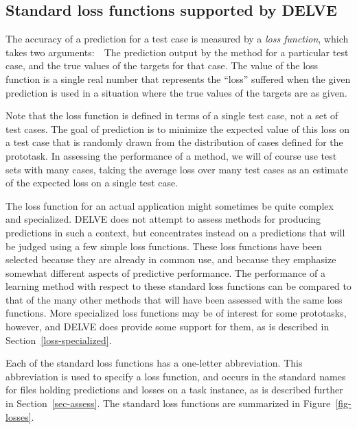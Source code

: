 \subsection{Standard loss functions supported by DELVE}\label{loss-standard}

The accuracy of a prediction for a test case is measured by a {\em
loss function\/}, which takes two arguments:\ \ The prediction output
by the method for a particular test case, and the true values of
the targets for that case.  The value of the loss function is a single
real number that represents the ``loss'' suffered when the given
prediction is used in a situation where the true values of the targets
are as given.  

Note that the loss function is defined in terms of a single test case,
not a set of test cases.  The goal of prediction is to minimize the
expected value of this loss on a test case that is randomly drawn from
the distribution of cases defined for the prototask.  In assessing the
performance of a method, we will of course use test sets with many
cases, taking the average loss over many test cases as an estimate of
the expected loss on a single test case.

The loss function for an actual application might sometimes be quite
complex and specialized.  DELVE does not attempt to assess methods for
producing predictions in such a context, but concentrates instead on a
predictions that will be judged using a few simple loss functions.
These loss functions have been selected because they are already in
common use, and because they emphasize somewhat different aspects of
predictive performance.  The performance of a learning method with
respect to these standard loss functions can be compared to that of
the many other methods that will have been assessed with the same
loss functions.  More specialized loss functions may be of interest
for some prototasks, however, and DELVE does provide some support for
them, as is described in Section~\ref{loss-specialized}.

Each of the standard loss functions has a one-letter abbreviation.
This abbreviation is used to specify a loss function, and occurs in
the standard names for files holding predictions and losses on a task
instance, as is described further in Section~\ref{sec-assess}.  The
standard loss functions are summarized in Figure~\ref{fig-losses}.

